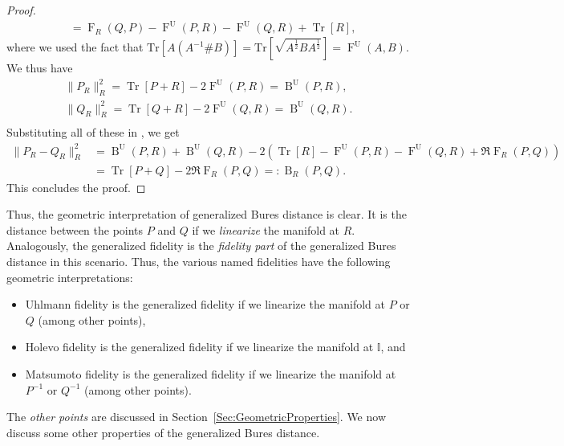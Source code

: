 \documentclass[12pt]{article}
\theoremstyle{definition}
\newcommand{\Fu}[2]{\operatorname{F}^\mathrm{U}\!\left(#1, #2\right)}
\begin{document}
\begin{proof}
\begin{equation}
\begin{aligned}
    &= \operatorname{F}_R(Q,P) - \Fu{P}{R} - \Fu{Q}{R} + \operatorname{Tr}[R],  
\end{aligned}
\end{equation}
where we used the fact that $\text{Tr}[A(A^{-1}  \# B)] =  \text{Tr}\left[\sqrt{A ^{\frac 12} B A ^{\frac 12} }\right] = \operatorname{F}^\mathrm U(A,B)$.
We thus have
\begin{equation}
\begin{aligned}
    \|P_R\|_R^2 = \operatorname{Tr}[P + R] - 2 \operatorname{F}^\mathrm U(P,R) = \operatorname{B}^\mathrm U(P,R), \\   
    \|Q_R\|_R^2 = \operatorname{Tr}[Q + R] - 2 \operatorname{F}^\mathrm U(Q,R) = \operatorname{B}^\mathrm U(Q,R). \\  
\end{aligned}
\end{equation}
Substituting all of these in , we get
\begin{equation}
\begin{aligned}
    \|P_R - Q_R\|_R^2 &= \operatorname{B}^\mathrm U(P,R) + \operatorname{B}^\mathrm U(Q,R) - 2 \left(\operatorname{Tr}[R] - \operatorname{F}^\mathrm U(P, R) - \operatorname{F}^\mathrm U(Q, R) + \Re \operatorname{F}_R(P,Q) \right) \\
    &= \operatorname{Tr}[P+Q] - 2 \Re \operatorname{F}_R(P,Q) =: \operatorname{B}_R(P,Q).  
\end{aligned} 
\end{equation}
This concludes the proof.
\end{proof}


Thus, the geometric interpretation of generalized Bures distance is clear. It is the distance between the points $P$ and $Q$ if we \textit{linearize} the manifold at $R$. Analogously, the generalized fidelity is the \textit{fidelity part} of the generalized Bures distance in this scenario. Thus, the various named fidelities have the following geometric interpretations:
\begin{itemize}
    \item Uhlmann fidelity is the generalized fidelity if we linearize the manifold at $P$ or $Q$ (among other points),
    \item Holevo fidelity is the generalized fidelity if we linearize the manifold at $\mathbb I$, and
    \item Matsumoto fidelity is the generalized fidelity if we linearize the manifold at $P ^{-1} $ or $Q ^{-1} $ (among other points).
\end{itemize}
The \textit{other points} are discussed in Section~\ref{Sec:GeometricProperties}. We now discuss some other properties of the generalized Bures distance.
\end{document}
